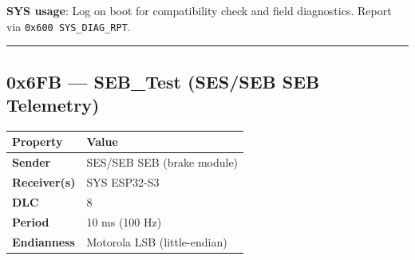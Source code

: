 \textbf{SYS usage}: Log on boot for compatibility check and field diagnostics.
Report via \texttt{0x600\ SYS\_DIAG\_RPT}.

\begin{center}\rule{0.5\linewidth}{0.5pt}\end{center}

\subsection{0x6FB --- SEB\_Test (SES/SEB SEB
Telemetry)}\label{x6fb-seb_test-SES/SEB-seb-telemetry}

\begin{longtable}[]{@{}ll@{}}
\toprule\noalign{}
Property & Value \\
\midrule\noalign{}
\endhead
\bottomrule\noalign{}
\endlastfoot
\textbf{Sender} & SES/SEB SEB (brake module) \\
\textbf{Receiver(s)} & SYS ESP32-S3 \\
\textbf{DLC} & 8 \\
\textbf{Period} & 10 ms (100 Hz) \\
\textbf{Endianness} & Motorola LSB (little-endian) \\
\end{longtable}

